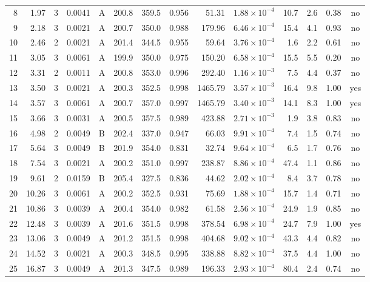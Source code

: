 \begin{landscape}
\begin{longtable}{rrrrlrrrrrrrrc}
8 & 1.97 & 3 & 0.0041 & A & 200.8 & 359.5 & 0.956 & 51.31 & $1.88\times10^{-4}$ & 10.7 & 2.6 & 0.38 & no \\
9 & 2.18 & 3 & 0.0021 & A & 200.7 & 350.0 & 0.988 & 179.96 & $6.46\times10^{-4}$ & 15.4 & 4.1 & 0.93 & no \\
10 & 2.46 & 2 & 0.0021 & A & 201.4 & 344.5 & 0.955 & 59.64 & $3.76\times10^{-4}$ & 1.6 & 2.2 & 0.61 & no \\
11 & 3.05 & 3 & 0.0061 & A & 199.9 & 350.0 & 0.975 & 150.20 & $6.58\times10^{-4}$ & 15.5 & 5.5 & 0.20 & no \\
12 & 3.31 & 2 & 0.0011 & A & 200.8 & 353.0 & 0.996 & 292.40 & $1.16\times10^{-3}$ & 7.5 & 4.4 & 0.37 & no \\
13 & 3.50 & 3 & 0.0021 & A & 200.3 & 352.5 & 0.998 & 1465.79 & $3.57\times10^{-3}$ & 16.4 & 9.8 & 1.00 & yes \\
14 & 3.57 & 3 & 0.0061 & A & 200.7 & 357.0 & 0.997 & 1465.79 & $3.40\times10^{-3}$ & 14.1 & 8.3 & 1.00 & yes \\
15 & 3.66 & 3 & 0.0031 & A & 200.5 & 357.5 & 0.989 & 423.88 & $2.71\times10^{-3}$ & 1.9 & 3.8 & 0.83 & no \\
16 & 4.98 & 2 & 0.0049 & B & 202.4 & 337.0 & 0.947 & 66.03 & $9.91\times10^{-4}$ & 7.4 & 1.5 & 0.74 & no \\
17 & 5.64 & 3 & 0.0049 & B & 201.9 & 354.0 & 0.831 & 32.74 & $9.64\times10^{-4}$ & 6.5 & 1.7 & 0.76 & no \\
18 & 7.54 & 3 & 0.0021 & A & 200.2 & 351.0 & 0.997 & 238.87 & $8.86\times10^{-4}$ & 47.4 & 1.1 & 0.86 & no \\
19 & 9.61 & 2 & 0.0159 & B & 205.4 & 327.5 & 0.836 & 44.62 & $2.02\times10^{-4}$ & 8.4 & 3.7 & 0.78 & no \\
20 & 10.26 & 3 & 0.0061 & A & 200.2 & 352.5 & 0.931 & 75.69 & $1.88\times10^{-4}$ & 15.7 & 1.4 & 0.71 & no \\
21 & 10.86 & 3 & 0.0039 & A & 200.4 & 354.0 & 0.982 & 61.58 & $2.56\times10^{-4}$ & 24.9 & 1.9 & 0.85 & no \\
22 & 12.48 & 3 & 0.0039 & A & 201.6 & 351.5 & 0.998 & 378.54 & $6.98\times10^{-4}$ & 24.7 & 7.9 & 1.00 & yes \\
23 & 13.06 & 3 & 0.0049 & A & 201.2 & 351.5 & 0.998 & 404.68 & $9.02\times10^{-4}$ & 43.3 & 4.4 & 0.82 & no \\
24 & 14.52 & 3 & 0.0021 & A & 200.3 & 348.5 & 0.995 & 338.88 & $8.82\times10^{-4}$ & 37.5 & 4.4 & 1.00 & no \\
25 & 16.87 & 3 & 0.0049 & A & 201.3 & 347.5 & 0.989 & 196.33 & $2.93\times10^{-4}$ & 80.4 & 2.4 & 0.74 & no \\

\end{longtable}
\end{landscape}
